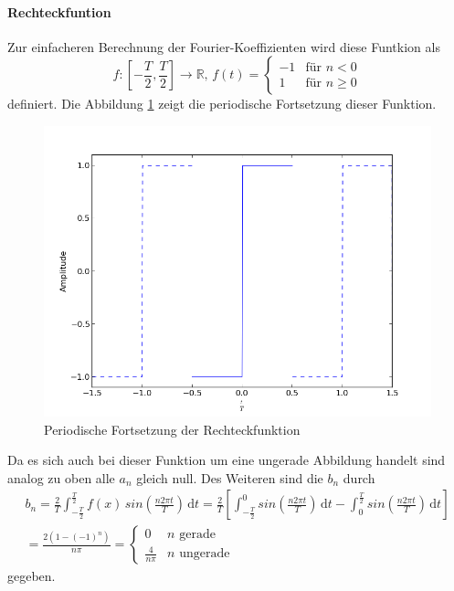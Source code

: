 \documentclass[11pt,ngerman,a4paper]{article}
\begin{document}
\paragraph{Rechteckfuntion} Zur einfacheren Berechnung der Fourier-Koeffizienten wird diese Funtkion als
\begin{equation}
f \colon  \left[-\frac{T}{2}, \frac{T}{2}\right]\to \mathbb{R},\,f(t) = \begin{cases}
-1 & \mbox{f\"ur } n < 0 \\
1  & \mbox{f\"ur } n \geq 0
\end{cases}
\end{equation}
definiert. Die Abbildung \ref{org_rect} zeigt die periodische Fortsetzung dieser Funktion. 
\begin{figure}[htp]
\centering
\includegraphics[scale=0.7]{abb/Abb3.png}
\caption{Periodische Fortsetzung der Rechteckfunktion}
\label{org_rect}
\end{figure}Da es sich auch bei dieser Funktion um eine ungerade Abbildung handelt sind analog zu oben alle $a_n$ gleich null. Des Weiteren sind die $b_n$ durch
\begin{align}
b_n = \frac 2 T\int_{-\frac T 2}^\frac T 2\!f(x)\,sin\left(\frac{n2\pi t}{T}\right)\,\mathrm dt = \frac 2 T \left[ \int_{-\frac T 2}^0\!sin\left(\frac{n2\pi t}{T}\right)\,\mathrm dt - \int_0^{\frac T 2}\!sin\left(\frac{n2\pi t}{T}\right)\,\mathrm dt \right] \\
= \frac{2 (1- (-1)^n)}{n \pi} =
\begin{cases}
0 & n \mbox{ gerade}\\
\frac4{n\pi} & n \mbox{ ungerade}
\end{cases} 
\end{align}
gegeben.
\end{document}
